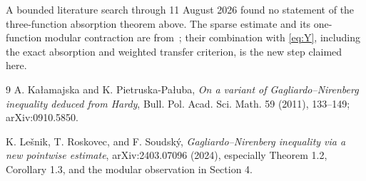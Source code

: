 \documentclass[11pt,a4paper]{article}
\begin{document}
A bounded literature search through 11 August 2026 found no statement of the
three-function absorption theorem above.  The sparse estimate and its
one-function modular contraction are from~\cite{LRS}; their combination with
\eqref{eq:Y}, including the exact absorption and weighted transfer criterion,
is the new step claimed here.

\begin{thebibliography}{9}
A. Ka\l amajska and K. Pietruska-Pa\l uba,
\emph{On a variant of Gagliardo--Nirenberg inequality deduced from Hardy},
Bull. Pol. Acad. Sci. Math. 59 (2011), 133--149; arXiv:0910.5850.

K. Le\v{s}nik, T. Roskovec, and F. Soudsk\'y,
\emph{Gagliardo--Nirenberg inequality via a new pointwise estimate},
arXiv:2403.07096 (2024), especially Theorem 1.2, Corollary 1.3, and the
modular observation in Section 4.
\end{thebibliography}
\end{document}
